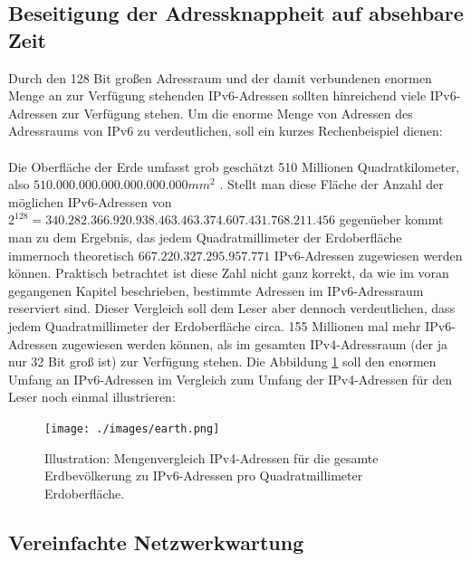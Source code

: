 \documentclass[a4paper,12pt]{scrartcl}
\begin{document}
\subsection{Beseitigung der Adressknappheit auf absehbare Zeit}
Durch den 128 Bit gro{\ss}en Adressraum und der damit verbundenen enormen Menge an zur Verf\"ugung stehenden IPv6-Adressen sollten hinreichend viele IPv6-Adressen zur Verfügung stehen.  Um die enorme Menge von Adressen des Adressraums von IPv6 zu verdeutlichen, soll ein kurzes Rechenbeispiel dienen:\\
\\
Die Oberfläche der Erde umfasst grob geschätzt 510 Millionen Quadratkilometer, also $510.000.000.000.000.000.000 mm^2$ . Stellt man diese Fl\"ache der Anzahl der m\"oglichen IPv6-Adressen von $2^{128} = 340.282.366.920.938.463.463.374.607.431.768.211.456$ gegen\"ueber kommt man zu dem Ergebnis, das jedem Quadratmillimeter der Erdoberfl\"ache immernoch theoretisch $667.220.327.295.957.771 $ IPv6-Adressen zugewiesen werden k\"onnen. Praktisch betrachtet ist diese Zahl nicht ganz korrekt, da wie im voran gegangenen Kapitel beschrieben, bestimmte Adressen im IPv6-Adressraum reserviert sind. Dieser Vergleich soll dem Leser aber dennoch verdeutlichen, dass jedem Quadratmillimeter der Erdoberfl\"ache circa. 155 Millionen mal mehr IPv6-Adressen zugewiesen werden k\"onnen, als im gesamten IPv4-Adressraum (der ja nur 32 Bit groß ist) zur Verf\"ugung stehen. Die Abbildung \ref{earth} soll den enormen Umfang an IPv6-Adressen im Vergleich zum Umfang der IPv4-Adressen f\"ur den Leser noch einmal illustrieren:

\clearpage

\begin{figure}[htb]
\begin{center}
 \texttt{[image: ./images/earth.png]}
 \end{center}
\caption[Illustration: Mengenvergleich IPv4-Adressen f\"ur die gesamte Erdbev\"olkerung zu IPv6-Adressen pro Quadratmillimeter Erdoberfl\"ache. Quelle Illustration: Autor, Quelle Erdfoto: \url{http://upload.wikimedia.org/wikipedia/commons/6/6f/Earth_Eastern_Hemisphere.jpg}]{
	\label{earth}Illustration: Mengenvergleich IPv4-Adressen f\"ur die gesamte Erdbev\"olkerung zu IPv6-Adressen pro Quadratmillimeter Erdoberfl\"ache.
}
\end{figure}

\subsection{Vereinfachte Netzwerkwartung}
\end{document}
